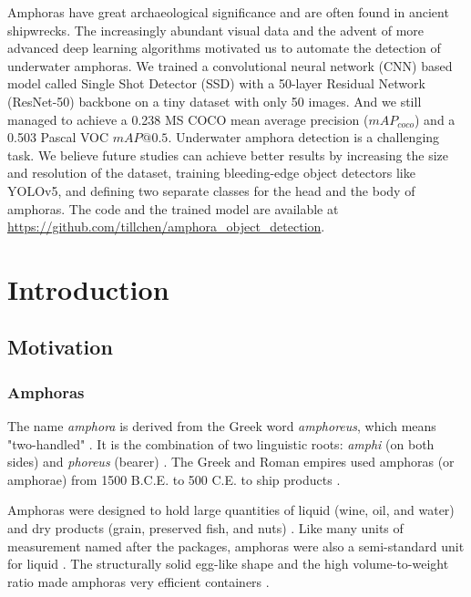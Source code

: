 \documentclass[a4paper, 11pt, oneside]{article}
\begin{document}
Amphoras have great archaeological significance and are often found in ancient shipwrecks. The increasingly abundant
visual data and the advent of more advanced deep learning algorithms motivated us to automate the detection of
underwater amphoras. We trained a convolutional neural network (CNN) based model called Single Shot Detector (SSD) with
a 50-layer Residual Network (ResNet-50) backbone on a tiny dataset with only 50 images. And we still managed to
achieve a 0.238 MS COCO mean average precision ($mAP_{coco}$) and a 0.503 Pascal VOC $mAP@0.5$. Underwater amphora
detection is a challenging task. We believe future studies can achieve better results by increasing the size and
resolution of the dataset, training bleeding-edge object detectors like YOLOv5, and defining two separate classes for
the head and the body of amphoras. The code and the trained model are available at
\url{https://github.com/tillchen/amphora_object_detection}.

\newpage

\tableofcontents

\clearpage
{}

\section{Introduction}

\subsection{Motivation}

\subsubsection{Amphoras}

The name \textit{amphora} is derived from the Greek word \textit{amphoreus}, which means "two-handled"
\cite{harper2001online, twede2002commercial, will1977ancient}. It is the combination of two linguistic roots:
\textit{amphi} (on both sides) and \textit{phoreus} (bearer) \cite{harper2001online, twede2002commercial, will1977ancient}.
The Greek and Roman empires used amphoras (or amphorae) from 1500 B.C.E. to 500 C.E. to ship products
\cite{twede2002commercial, worldhistory}.

Amphoras were designed to hold large quantities of liquid (wine, oil, and water) and dry products (grain, preserved fish,
and nuts) \cite{twede2002commercial, foley2012aspects, grace1979amphoras}. Like many units of measurement named after
the packages, amphoras were also a semi-standard unit for liquid \cite{twede2002commercial}.
The structurally solid egg-like shape and the high volume-to-weight ratio made amphoras very efficient containers
\cite{twede2002commercial, worldhistory}.
\end{document}
